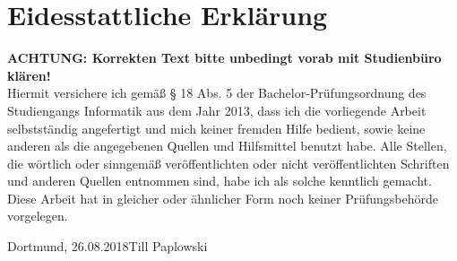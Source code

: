 \documentclass[
	oneside,  %
	ngerman, 
	final, 
	11pt, 
	a4paper, 
	1.1headlines, 
	headinclude=false, 
	footinclude=false, 
	mpinclude=false, 
	pagesize, 
	onecolumn, 
	titlepage, 
	parskip=half, 
	headsepline, 
	chapterprefix=false, 
	version=first, 
	listof=totoc, 
	bibliography=totoc, 
	toc=graduated, 
	fleqn
]{scrbook}
\newcommand*{\fhdopaperdate}{26.08.2018}
\newcommand*{\fhdopaperauthor}{Till Paplowski}
\begin{document}


	
\chapter*{Eidesstattliche Erklärung}
\thispagestyle{empty}
\textbf{ACHTUNG: Korrekten Text bitte unbedingt vorab mit Studienbüro klären!}\\
Hiermit versichere ich gemäß § 18 Abs. 5 der Bachelor-Prüfungsordnung des Studiengangs Informatik aus dem Jahr 2013, dass ich die  vorliegende Arbeit selbstständig angefertigt und mich keiner fremden Hilfe bedient, sowie keine anderen als die angegebenen Quellen und Hilfsmittel benutzt habe. Alle Stellen, die wörtlich oder sinngemäß veröffentlichten oder nicht veröffentlichten Schriften und anderen Quellen entnommen sind, habe ich als solche kenntlich gemacht. Diese Arbeit hat in gleicher oder ähnlicher Form noch keiner Prüfungsbehörde vorgelegen.

\vspace{1\baselineskip}%
Dortmund, \fhdopaperdate \hfill \fhdopaperauthor
\end{document}
